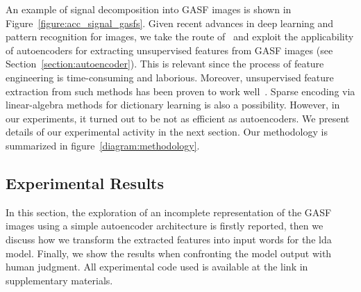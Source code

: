 An example of signal decomposition into GASF images is shown in Figure~\ref{figure:acc_signal_gasfs}. Given recent advances in deep learning and pattern recognition for images, we take the route of~\cite{wang_encoding_2015} and exploit the applicability of autoencoders for extracting unsupervised features from GASF images (see Section~\ref{section:autoencoder}). This is relevant since the process of feature engineering is time-consuming and laborious. Moreover, unsupervised feature extraction from such methods has been proven to work well~\cite{wang_imaging_2015, wang_time_2016}.
Sparse encoding via linear-algebra methods for dictionary learning is also a possibility. However, in our experiments, it turned out to be not as efficient as autoencoders. We present details of our experimental activity in the next section. Our methodology is summarized in figure~\ref{diagram:methodology}.

%
%

\subsection{Experimental Results}
In this section, the exploration of an incomplete representation of the GASF images using a simple autoencoder architecture is firstly reported, then we discuss how we transform the extracted features into input words for the \gls{lda} model. Finally, we show the results when confronting the model output with human judgment. All experimental code used is available at the link in supplementary materials. %

